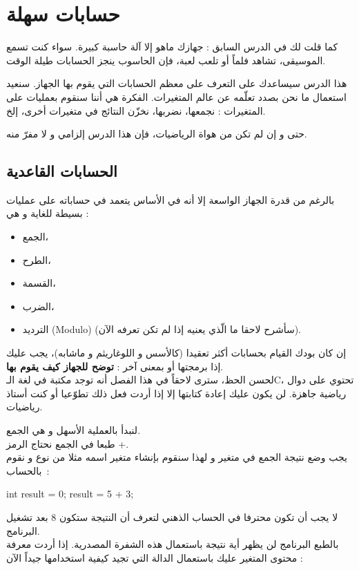 \chapter{حسابات سهلة}

كما قلت لك في الدرس السابق : جهازك ماهو إلا آلة حاسبة كبيرة. سواء كنت تسمع الموسيقى، تشاهد فلماً أو تلعب لعبة، فإن الحاسوب ينجز الحسابات طيلة الوقت.

هذا الدرس سيساعدك على التعرف على معظم الحسابات التي يقوم بها الجهاز. سنعيد استعمال ما نحن بصدد تعلّمه عن عالم المتغيرات. الفكرة هي أننا سنقوم بعمليات على المتغيرات : نجمعها، نضربها، نخزّن النتائج في متغيرات أخرى، إلخ.

حتى و إن لم تكن من هواة الرياضيات، فإن هذا الدرس إلزامي و لا مفرّ منه.

\section{الحسابات القاعدية}

بالرغم من قدرة الجهاز الواسعة إلا أنه في الأساس يتعمد في حساباته على عمليات بسيطة للغاية و هي :

\begin{itemize}
  \item الجمع،
  \item الطرح،
  \item القسمة،
  \item الضرب،
  \item الترديد
(\textenglish{Modulo})
(سأشرح لاحقا ما الّذي يعنيه إذا لم تكن تعرفه الآن).
\end{itemize}

إن كان بودك القيام بحسابات أكثر تعقيدا (كالأسس و اللوغاريثم و ماشابه)، يجب عليك إذا برمجتها أو بمعنى آخر :
\textbf{توضح للجهاز كيف يقوم بها}.\\
لحسن الحظ، سترى لاحقاً في هذا الفصل أنه توجد مكتبة في لغة الـ\textenglish{C}،
تحتوي على دوال رياضية جاهزة. لن يكون عليك إعادة كتابتها إلا إذا أردت فعل ذلك تطوّعيا أو كنت أستاذ رياضيات.

لنبدأ بالعملية الأسهل و هي الجمع.\\
طبعا في الجمع نحتاج الرمز +.\\
يجب وضع نتيجة الجمع في متغير و لهذا سنقوم بإنشاء متغير اسمه مثلا
من نوع
و نقوم بالحساب~:

\begin{Csource}
  int result = 0;
  result = 5 + 3;
\end{Csource}

لا يجب أن تكون محترفا في الحساب الذهني لتعرف أن النتيجة ستكون 8 بعد تشغيل البرنامج.\\
بالطبع البرنامج لن يظهر أية نتيجة باستعمال هذه الشفرة المصدرية. إذا أردت معرفة محتوى المتغير
عليك باستعمال الدالة
التي تجيد كيفية استخدامها جيداً الآن :

